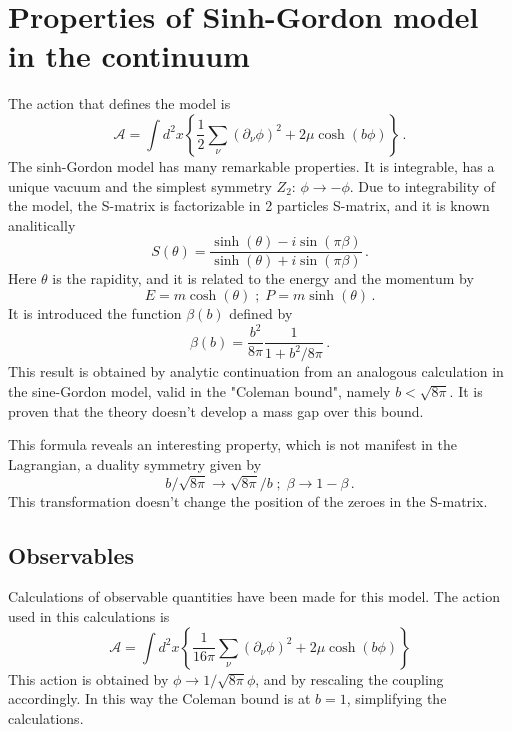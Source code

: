 \documentclass[12pt,a4paper]{report}
\begin{document}
\chapter{Properties of Sinh-Gordon model in the continuum }
\label{sec:sinh_G_properties}
The action that defines the model is \begin{equation}
\mathcal{A} = \int d^2x \left\lbrace\dfrac{1}{2 } \sum_\nu (\partial_\nu \phi )^2 + 2 \mu \cosh(b \phi) \right\rbrace \,.
\end{equation} 
The sinh-Gordon model has many remarkable properties. It is integrable, has a unique vacuum and the simplest symmetry $Z_2$: $\phi \to -\phi$. Due to  integrability 	of the model, the S-matrix is factorizable in 2 particles S-matrix, and it is known analitically \begin{equation}
S(\theta) = \dfrac{\sinh(\theta) -i \sin (\pi \beta)}{\sinh(\theta) +i \sin (\pi \beta) } \,.
\end{equation} Here $\theta$ is the rapidity, and it is related to the energy and the momentum by \begin{equation}
E = m \cosh(\theta) \; ; \; P = m \sinh(\theta)\,.
\end{equation} It is introduced the function $\beta(b)$ defined by \begin{equation}
\beta(b) =  \dfrac{b^2}{8\pi} \dfrac{1}{1+ b^2/8 \pi} \,.
\end{equation} This result is obtained by analytic continuation from an analogous calculation in the sine-Gordon model, valid in the "Coleman bound", namely $b < \sqrt{8\pi}$. It is proven that the theory doesn't develop a mass gap over this bound. 

This formula reveals an interesting property, which is not manifest in the Lagrangian, a duality symmetry given by \begin{equation}
b/\sqrt{8\pi} \to \sqrt{8 \pi}/b \; ; \; \beta \to 1- \beta \,.
\end{equation} This transformation doesn't change the position of the zeroes in the S-matrix.


\section{Observables}
Calculations of observable quantities have been made for this model. 
The action used in this calculations is \begin{equation}
\mathcal{A} = \int d^2x  \left\lbrace\dfrac{1}{16 \pi} \sum_\nu (\partial_\nu \phi )^2 + 2 \mu \cosh(b \phi) \right\rbrace 
\end{equation} This action is obtained by $\phi \to 1/ \sqrt{8 \pi} \phi$,
   and by rescaling the coupling accordingly. In this way the Coleman bound is at $b=1$, simplifying the calculations. 
   
\end{document}
